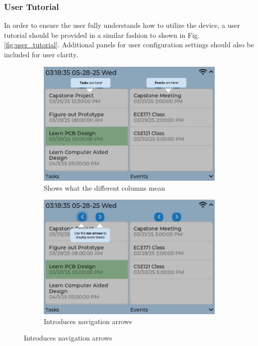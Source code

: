 \subsubsection{User Tutorial}
In order to ensure the user fully understands how to utilize the device, a user tutorial should be provided in a similar fashion to shown in Fig. \ref{fig:user_tutorial}. Additional panels for user configuration settings should also be included for user clarity.
\begin{figure}
    \begin{subfigure}{0.5\textwidth}
        \includegraphics[width = \textwidth]{task_event.png}
        \caption{Shows what the different columns mean}
    \end{subfigure}
    \begin{subfigure}{0.5\textwidth}
        \includegraphics[width = \textwidth]{nav_arrows.png}
        \caption{Introduces navigation arrows}

\end{subfigure}
\end{figure}
